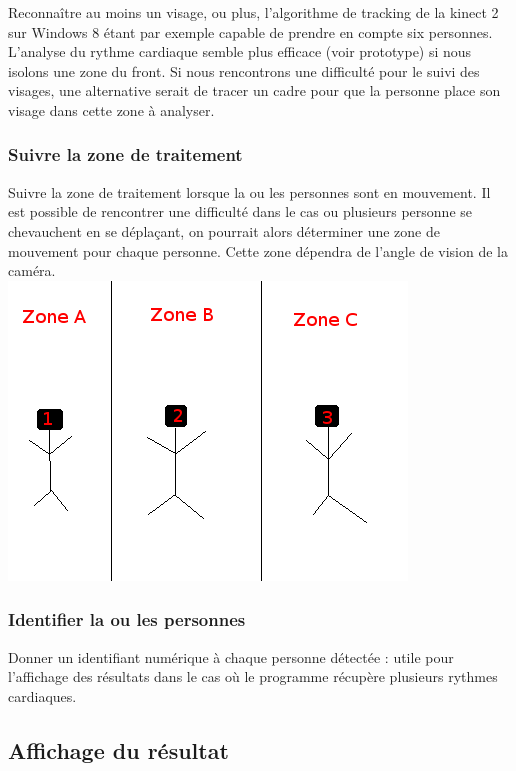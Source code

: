 \documentclass[12pt,a4paper]{article}
\begin{document}
Reconnaître au moins un visage, ou plus, l'algorithme de tracking de la kinect 2 sur Windows 8 étant par exemple capable de prendre en compte six personnes.
L'analyse du rythme cardiaque semble plus efficace (voir prototype) si nous isolons une zone du front.
Si nous rencontrons une difficulté pour le suivi des visages, une alternative serait de tracer un cadre pour que la personne place son visage dans cette zone à analyser.

\subsubsection{Suivre la zone de traitement}

Suivre la zone de traitement lorsque la ou les personnes sont en mouvement. Il est possible de rencontrer une difficulté dans le cas ou plusieurs personne se chevauchent en se déplaçant, on pourrait alors déterminer une zone de mouvement pour chaque personne. Cette zone dépendra de l'angle de vision de la caméra.\\

\includegraphics[scale=0.75]{zone_mouvement.png}

\subsubsection{Identifier la ou les personnes}

Donner un identifiant numérique à chaque personne détectée : utile pour l'affichage des résultats dans le cas où le programme récupère plusieurs rythmes cardiaques.


\subsection{Affichage du résultat}
\end{document}
